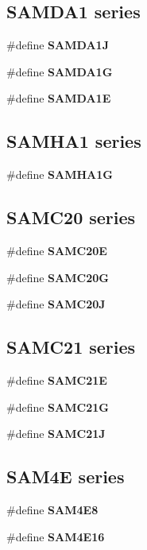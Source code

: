 \subsection*{S\+A\+M\+D\+A1 series}
\begin{DoxyCompactItemize}
\item 
\#define {\bfseries S\+A\+M\+D\+A1\+J}
\item 
\#define {\bfseries S\+A\+M\+D\+A1\+G}
\item 
\#define {\bfseries S\+A\+M\+D\+A1\+E}
\end{DoxyCompactItemize}
\subsection*{S\+A\+M\+H\+A1 series}
\begin{DoxyCompactItemize}
\item 
\#define {\bfseries S\+A\+M\+H\+A1\+G}
\end{DoxyCompactItemize}
\subsection*{S\+A\+M\+C20 series}
\begin{DoxyCompactItemize}
\item 
\#define {\bfseries S\+A\+M\+C20\+E}
\item 
\#define {\bfseries S\+A\+M\+C20\+G}
\item 
\#define {\bfseries S\+A\+M\+C20\+J}
\end{DoxyCompactItemize}
\subsection*{S\+A\+M\+C21 series}
\begin{DoxyCompactItemize}
\item 
\#define {\bfseries S\+A\+M\+C21\+E}
\item 
\#define {\bfseries S\+A\+M\+C21\+G}
\item 
\#define {\bfseries S\+A\+M\+C21\+J}
\end{DoxyCompactItemize}
\subsection*{S\+A\+M4\+E series}
\begin{DoxyCompactItemize}
\item 
\#define {\bfseries S\+A\+M4\+E8}
\item 
\#define {\bfseries S\+A\+M4\+E16}
\end{DoxyCompactItemize}
